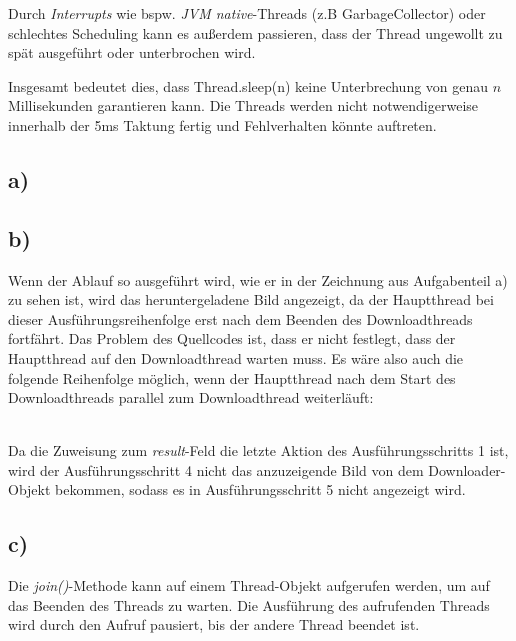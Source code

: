 \documentclass[ngerman]{fbi-aufgabenblatt}
\begin{document}
Durch \textit{Interrupts} wie bspw. \textit{JVM native}-Threads (z.B GarbageCollector) oder schlechtes Scheduling kann es außerdem passieren, dass der Thread ungewollt zu spät ausgeführt oder unterbrochen wird.

Insgesamt bedeutet dies, dass Thread.sleep(n) keine Unterbrechung von genau $n$ Millisekunden garantieren kann. Die Threads werden nicht notwendigerweise innerhalb der 5ms Taktung fertig und Fehlverhalten könnte auftreten.


\subsection*{a)}
\subsection*{b)}
Wenn der Ablauf so ausgeführt wird, wie er in der Zeichnung aus Aufgabenteil a) zu sehen ist, wird das heruntergeladene Bild angezeigt, da der Hauptthread bei dieser Ausführungsreihenfolge erst nach dem Beenden des Downloadthreads fortfährt. Das Problem des Quellcodes ist, dass er nicht festlegt, dass der Hauptthread auf den Downloadthread warten muss. Es wäre also auch die folgende Reihenfolge möglich, wenn der Hauptthread nach dem Start des Downloadthreads parallel zum Downloadthread weiterläuft: \\

 \\
Da die Zuweisung zum \textit{result}-Feld die letzte Aktion des Ausführungsschritts 1 ist, wird der Ausführungsschritt 4 nicht das anzuzeigende Bild von dem Downloader-Objekt bekommen, sodass es in Ausführungsschritt 5 nicht angezeigt wird.
\subsection*{c)}
Die \textit{join()}-Methode kann auf einem Thread-Objekt aufgerufen werden, um auf das Beenden des Threads zu warten. Die Ausführung des aufrufenden Threads wird durch den Aufruf pausiert, bis der andere Thread beendet ist.
\end{document}
